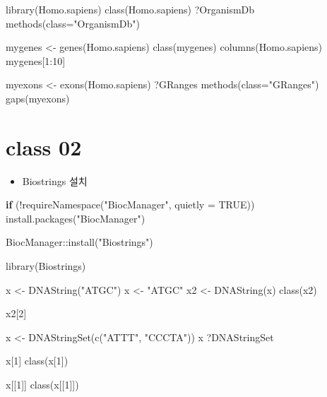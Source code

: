\documentclass[
]{book}
\newenvironment{Shaded}{\begin{snugshade}}{\end{snugshade}}
\newcommand{\AttributeTok}[1]{\textcolor[rgb]{0.77,0.63,0.00}{#1}}
\newcommand{\ConstantTok}[1]{\textcolor[rgb]{0.00,0.00,0.00}{#1}}
\newcommand{\ControlFlowTok}[1]{\textcolor[rgb]{0.13,0.29,0.53}{\textbf{#1}}}
\newcommand{\DecValTok}[1]{\textcolor[rgb]{0.00,0.00,0.81}{#1}}
\newcommand{\FunctionTok}[1]{\textcolor[rgb]{0.00,0.00,0.00}{#1}}
\newcommand{\NormalTok}[1]{#1}
\newcommand{\OtherTok}[1]{\textcolor[rgb]{0.56,0.35,0.01}{#1}}
\newcommand{\SpecialCharTok}[1]{\textcolor[rgb]{0.00,0.00,0.00}{#1}}
\newcommand{\StringTok}[1]{\textcolor[rgb]{0.31,0.60,0.02}{#1}}
\providecommand{\tightlist}{%
  \setlength{\itemsep}{0pt}\setlength{\parskip}{0pt}}
\begin{document}
\begin{Shaded}
\begin{Highlighting}[]

\FunctionTok{library}\NormalTok{(Homo.sapiens)}
\FunctionTok{class}\NormalTok{(Homo.sapiens)}
\NormalTok{?OrganismDb}
\FunctionTok{methods}\NormalTok{(}\AttributeTok{class=}\StringTok{"OrganismDb"}\NormalTok{)}

\NormalTok{mygenes }\OtherTok{\textless{}{-}} \FunctionTok{genes}\NormalTok{(Homo.sapiens)}
\FunctionTok{class}\NormalTok{(mygenes)}
\FunctionTok{columns}\NormalTok{(Homo.sapiens)}
\NormalTok{mygenes[}\DecValTok{1}\SpecialCharTok{:}\DecValTok{10}\NormalTok{]}

\NormalTok{myexons }\OtherTok{\textless{}{-}} \FunctionTok{exons}\NormalTok{(Homo.sapiens)}
\NormalTok{?GRanges}
\FunctionTok{methods}\NormalTok{(}\AttributeTok{class=}\StringTok{"GRanges"}\NormalTok{)}
\FunctionTok{gaps}\NormalTok{(myexons)}
\end{Highlighting}
\end{Shaded}

\hypertarget{class-02-2}{%
\section{class 02}\label{class-02-2}}

\begin{itemize}
\tightlist
\item
  Biostrings 설치
\end{itemize}

\begin{Shaded}
\begin{Highlighting}[]
\ControlFlowTok{if}\NormalTok{ (}\SpecialCharTok{!}\FunctionTok{requireNamespace}\NormalTok{(}\StringTok{"BiocManager"}\NormalTok{, }\AttributeTok{quietly =} \ConstantTok{TRUE}\NormalTok{))}
    \FunctionTok{install.packages}\NormalTok{(}\StringTok{"BiocManager"}\NormalTok{)}

\NormalTok{BiocManager}\SpecialCharTok{::}\FunctionTok{install}\NormalTok{(}\StringTok{"Biostrings"}\NormalTok{)}

\FunctionTok{library}\NormalTok{(Biostrings)}

\NormalTok{x }\OtherTok{\textless{}{-}} \FunctionTok{DNAString}\NormalTok{(}\StringTok{"ATGC"}\NormalTok{)}
\NormalTok{x }\OtherTok{\textless{}{-}} \StringTok{"ATGC"}
\NormalTok{x2 }\OtherTok{\textless{}{-}} \FunctionTok{DNAString}\NormalTok{(x)}
\FunctionTok{class}\NormalTok{(x2)}


\NormalTok{x2[}\DecValTok{2}\NormalTok{]}

\NormalTok{x }\OtherTok{\textless{}{-}} \FunctionTok{DNAStringSet}\NormalTok{(}\FunctionTok{c}\NormalTok{(}\StringTok{"ATTT"}\NormalTok{, }\StringTok{"CCCTA"}\NormalTok{))}
\NormalTok{x}
\NormalTok{?DNAStringSet}

\NormalTok{x[}\DecValTok{1}\NormalTok{]}
\FunctionTok{class}\NormalTok{(x[}\DecValTok{1}\NormalTok{])}

\NormalTok{x[[}\DecValTok{1}\NormalTok{]]}
\FunctionTok{class}\NormalTok{(x[[}\DecValTok{1}\NormalTok{]])}
\end{Highlighting}
\end{Shaded}
\end{document}
